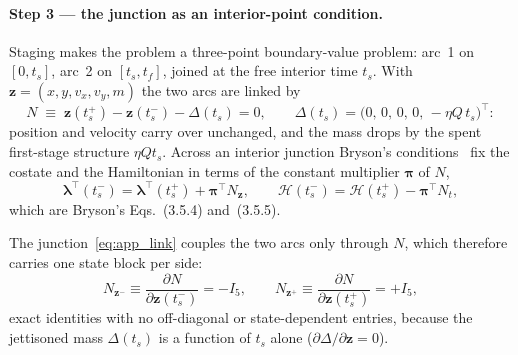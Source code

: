 \documentclass[../main.tex]{subfiles}
\begin{document}
\paragraph{Step 3 --- the junction as an interior-point condition.}
Staging makes the problem a three-point boundary-value problem: arc~1 on $[0,t_s]$, arc~2 on $[t_s,t_f]$, joined at the free interior time $t_s$. With $\mathbf{z} = (x,y,v_x,v_y,m)$ the two arcs are linked by
\begin{equation}
  N \;\equiv\; \mathbf{z}(t_s^+) - \mathbf{z}(t_s^-) - \Delta(t_s) = 0,
  \qquad \Delta(t_s) = \bigl(0,\,0,\,0,\,0,\,-\eta Q\,t_s\bigr)^{\!\top}:
  \label{eq:app_link}
\end{equation}
position and velocity carry over unchanged, and the mass drops by the spent first-stage structure $\eta Q t_s$. Across an interior junction Bryson's conditions~\cite[Sec.~3.5]{bryson1975} fix the costate and the Hamiltonian in terms of the constant multiplier $\boldsymbol{\pi}$ of $N$,
\begin{equation}
  \boldsymbol{\lambda}^{\!\top}(t_s^-) = \boldsymbol{\lambda}^{\!\top}(t_s^+) + \boldsymbol{\pi}^{\!\top} N_{\mathbf{z}},
  \qquad
  \mathcal{H}(t_s^-) = \mathcal{H}(t_s^+) - \boldsymbol{\pi}^{\!\top} N_t ,
  \label{eq:app_35}
\end{equation}
which are Bryson's Eqs.~(3.5.4) and~(3.5.5).

The junction~\eqref{eq:app_link} couples the two arcs only through $N$, which therefore carries one state block per side:
\begin{equation}
  N_{\mathbf{z}^-} \equiv \frac{\partial N}{\partial \mathbf{z}(t_s^-)} = -I_5,
  \qquad
  N_{\mathbf{z}^+} \equiv \frac{\partial N}{\partial \mathbf{z}(t_s^+)} = +I_5 ,
\end{equation}
exact identities with no off-diagonal or state-dependent entries, because the jettisoned mass $\Delta(t_s)$ is a function of $t_s$ alone ($\partial\Delta/\partial\mathbf{z} = 0$).
\end{document}
